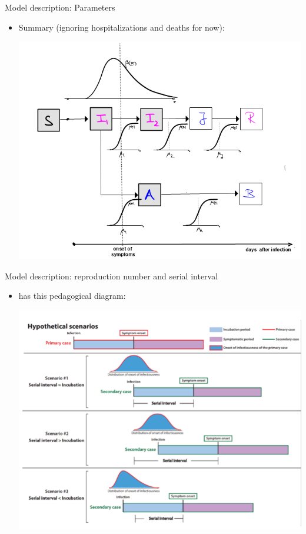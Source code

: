 \documentclass{beamer}
\begin{document}
    \begin{frame}{Model description: Parameters}
  \begin{itemize}
  \item Summary (ignoring hospitalizations and deaths for now):  
  \begin{center}
  \includegraphics[scale=0.45]{SIIAR-diagram-AARMS-2.png} 
  \end{center}  
\end{itemize} 
  \end{frame}

  
  \begin{frame}{Model description: reproduction number and serial interval}
   \begin{itemize}
 \item \cite{he2020temporal} has this pedagogical diagram:  
 \begin{center}
  \includegraphics[scale=0.32]{Leung.png} 
 \end{center}
 \end{itemize} 
  \end{frame}
  
\end{document}
